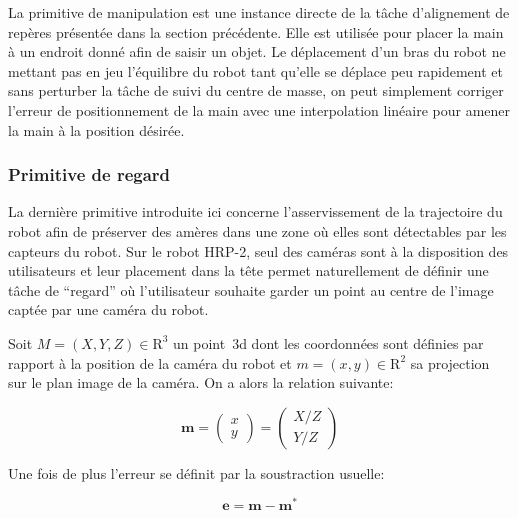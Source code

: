 La primitive de manipulation est une instance directe de la tâche
d'alignement de repères présentée dans la section précédente. Elle
est utilisée pour placer la main à un endroit donné afin de saisir un
objet. Le déplacement d'un bras du robot ne mettant pas en jeu
l'équilibre du robot tant qu'elle se déplace peu rapidement et sans
perturber la tâche de suivi du centre de masse, on peut simplement
corriger l'erreur de positionnement de la main avec une interpolation
linéaire pour amener la main à la position désirée.


\subsubsection{Primitive de regard}


La dernière primitive introduite ici concerne l'asservissement de la
trajectoire du robot afin de préserver des amères dans une zone où
elles sont détectables par les capteurs du robot. Sur le robot HRP-2,
seul des caméras sont à la disposition des utilisateurs et leur
placement dans la tête permet naturellement de définir une tâche de
``regard'' où l'utilisateur souhaite garder un point au centre de
l'image captée par une caméra du robot.

Soit \mbox{$M = (X, Y, Z) \in \mathrm{R}^3$} un point 3d dont les
coordonnées sont définies par rapport à la position de la caméra du
robot et \mbox{$m = (x, y) \in \mathrm{R}^2$} sa projection sur le
plan image de la caméra. On a alors la
relation suivante:

\begin{equation}
  \mathbf{m} = \left(
  \begin{array}{c}
    x\\
    y
  \end{array}
  \right) = \left(
  \begin{array}{c}
    X / Z\\
    Y / Z
  \end{array}
  \right)
\end{equation}


Une fois de plus l'erreur se définit par la soustraction usuelle:

\begin{equation}
  \mathbf{e} = \mathbf{m} - \mathbf{m}^*
\end{equation}

